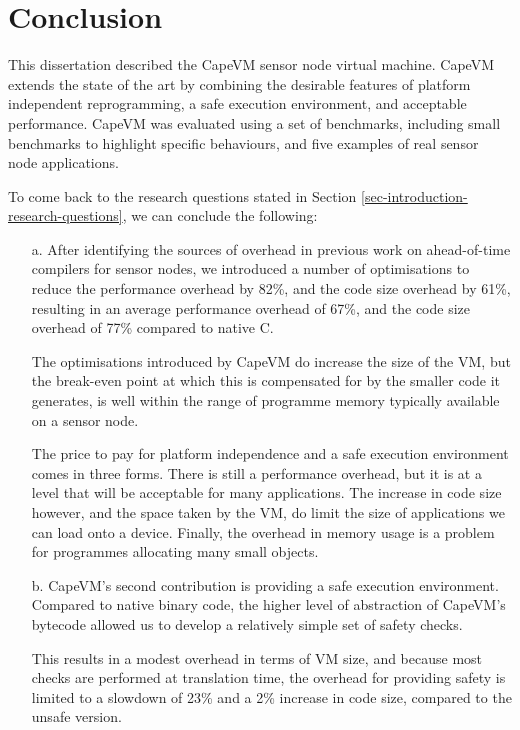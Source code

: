 \chapter{Conclusion}
This dissertation described the CapeVM sensor node virtual machine. CapeVM extends the state of the art by combining the desirable features of platform independent reprogramming, a safe execution environment, and acceptable performance. CapeVM was evaluated using a set of benchmarks, including small benchmarks to highlight specific behaviours, and five examples of real sensor node applications.

To come back to the research questions stated in Section \ref{sec-introduction-research-questions}, we can conclude the following:

\begin{enumerate}
	\item[a.]
	After identifying the sources of overhead in previous work on ahead-of-time compilers for sensor nodes, we introduced a number of optimisations to reduce the performance overhead by 82\%, and the code size overhead by 61\%, resulting in an average performance overhead of 67\%, and the code size overhead of 77\% compared to native C.

	The optimisations introduced by CapeVM do increase the size of the VM, but the break-even point at which this is compensated for by the smaller code it generates, is well within the range of programme memory typically available on a sensor node.

	The price to pay for platform independence and a safe execution environment comes in three forms. There is still a performance overhead, but it is at a level that will be acceptable for many applications. The increase in code size however, and the space taken by the VM, do limit the size of applications we can load onto a device. Finally, the overhead in memory usage is a problem for programmes allocating many small objects.

	\item[b.]
	CapeVM's second contribution is providing a safe execution environment. Compared to native binary code, the higher level of abstraction of CapeVM's bytecode allowed us to develop a relatively simple set of safety checks.
	
	This results in a modest overhead in terms of VM size, and because most checks are performed at translation time, the overhead for providing safety is limited to a slowdown of 23\% and a 2\% increase in code size, compared to the unsafe version.
	

\end{enumerate}

